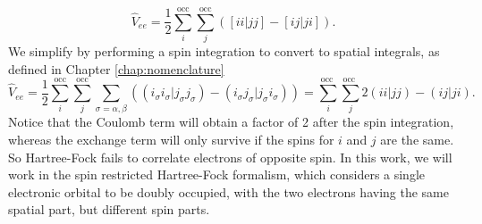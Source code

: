 \documentclass[12pt]{caltech_thesis}
\begin{document}
\begin{equation}
    \hat{V}_{ee} = \frac{1}{2} \sum_{{i}}^{\text{occ}} \sum_{{j}}^{\text{occ}} \left( [{i}{i}|{j}{j}] - [{i}{j}|{j}{i}] \right).
\end{equation}
 We simplify by performing a spin integration to convert to spatial integrals, as defined in Chapter \ref{chap:nomenclature}
\begin{equation}
    \hat{V}_{ee} = \frac{1}{2} \sum_{{i}}^{\text{occ}} \sum_{{j}}^{\text{occ}} \sum_{\sigma = \alpha, \beta} \left( (i_{\sigma }i_{\sigma }|j_{\sigma }j_{\sigma }) - (i_{\sigma }j_{\sigma }|j_{\sigma }i_{\sigma }) \right) = \sum_i^{\text {occ }} \sum_j^{\text {occ }} 2(ii|jj) - (ij|ji).
\end{equation}
Notice that the Coulomb term will obtain a factor of 2 after the spin integration, whereas the exchange term will only survive if the spins for $i$ and $j$ are the same. So Hartree-Fock fails to correlate electrons of opposite spin. In this work, we will work in the spin restricted Hartree-Fock formalism, which considers a single electronic orbital to be doubly occupied, with the two electrons having the same spatial part, but different spin parts.
\end{document}
